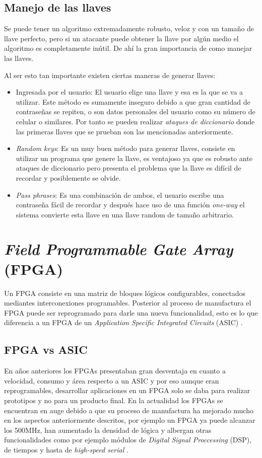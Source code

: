 \subsection{Manejo de las llaves}
Se puede tener un algoritmo extremadamente robusto, veloz y con un tamaño de llave perfecto, pero si un atacante puede obtener la llave por algún medio el algoritmo es completamente inútil. De ahí la gran importancia de como manejar las llaves.

Al ser esto tan importante existen ciertas maneras de generar llaves:
\begin{itemize}
\item Ingresada por el usuario: El usuario elige una llave y esa es la que se va a utilizar. Este método es sumamente inseguro
debido a que gran cantidad de contraseñas se repiten, o son datos personales del usuario como su número de celular o similares.
Por tanto se pueden realizar \textit{ataques de diccionario} donde las primeras llaves que se prueban son las mencionadas
anteriormente.

\item \textit{Random keys}: Es un muy buen método para generar llaves, consiste en utilizar un programa que genere la llave, es ventajoso
ya que es robusto ante ataques de diccionario pero presenta el problema que la llave es difícil de recordar y posiblemente se olvide.

\item \textit{Pass phrases}: Es una combinación de ambos, el usuario escribe una contraseña fácil de recordar y después hace uso de una función \textit{one-way} el sistema convierte esta llave en una llave random de tamaño arbitrario.
\end{itemize}

\section{\textit{Field Programmable Gate Array} (FPGA)}
Un FPGA consiste en una matriz de bloques lógicos configurables, conectados mediantes interconexiones programables. Posterior al proceso de manufactura el FPGA puede ser reprogramado para darle una nueva funcionalidad, esto es lo que diferencia a un FPGA de un \textit{Application Specific Integrated Circuits} (ASIC) \citep{xilinx1}. 

\subsection{FPGA vs ASIC}
En años anteriores los FPGAs presentaban gran desventaja en cuanto a velocidad, consumo y área respecto a un ASIC y por eso aunque eran reprogramables, desarrollar aplicaciones en un FPGA solo se daba para realizar prototipos y no para un producto final. En la actualidad los FPGAs se encuentran en auge debido a que su proceso de manufactura ha mejorado mucho en los aspectos anteriormente descritos, por ejemplo un FPGA ya puede alcanzar los 500MHz, han aumentado la densidad de lógica y albergan otras funcionalidades como por ejemplo módulos de \textit{Digital Signal Proccessing} (DSP), de tiempos y hasta de \textit{high-speed serial} \citep{xilinx1}.

